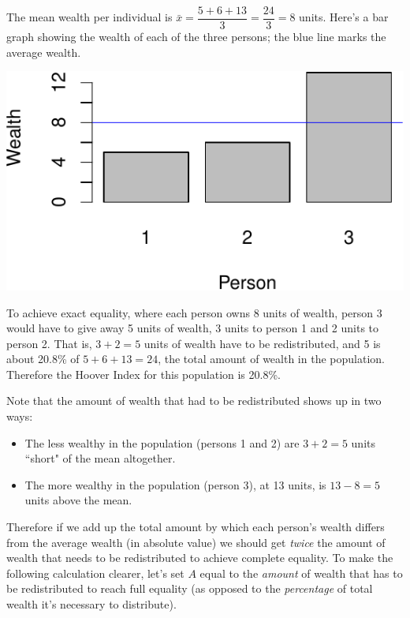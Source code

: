 \documentclass[12pt]{memoir}\usepackage[]{graphicx}\usepackage[table]{xcolor}
\begin{document}
The mean wealth per individual is $\bar{x} = \dfrac{5 + 6 + 13}{3} = \dfrac{24}{3} =  8$ units.  Here's
a bar graph showing the wealth of each of the three persons; the blue line
marks the average wealth.


\begin{center}
\includegraphics{figure/bar1-1.pdf}
\end{center}

To achieve exact equality, where each person owns 8 units of wealth, person 3
would have to give away 5 units of wealth, 3 units to person 1 and 2 units to
person 2.  That is, $3 + 2 = 5$ units of wealth have to be redistributed, and
5 is about 20.8\% of $5 + 6 + 13 = 24$, the total amount of wealth in the population.  Therefore the Hoover
Index for this population is 20.8\%. 

Note that the amount of wealth that had to be redistributed shows up 
in two ways: 

\begin{itemize}
\item The less wealthy in the population (persons 1 and 2) are $3 + 2 = 5$ units ``short" 
of the mean altogether.
\item The more wealthy in the population (person 3), at 13 units, is $13 - 8 = 5$ units above the mean. 
\end{itemize}

Therefore if we add up the total amount by which each person's wealth differs from the average
wealth (in absolute value) we should get \emph{twice} the amount of wealth that needs 
to be redistributed to achieve complete equality.  To make the following
calculation clearer, let's set $A$ equal to the \emph{amount} of wealth that has
to be redistributed to reach full equality (as opposed to the
\emph{percentage} of total wealth it's necessary to distribute).
\end{document}
